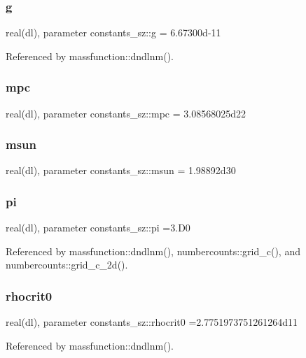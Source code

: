 \subsubsection{\texorpdfstring{g}{g}}
{\footnotesize\ttfamily real(dl), parameter constants\+\_\+sz\+::g = 6.\+67300d-\/11}



Referenced by massfunction\+::dndlnm().

\mbox{\label{namespaceconstants__sz_a961cb32bc8976382938d3a7904a98a59}} 
\subsubsection{\texorpdfstring{mpc}{mpc}}
{\footnotesize\ttfamily real(dl), parameter constants\+\_\+sz\+::mpc = 3.\+08568025d22}

\mbox{\label{namespaceconstants__sz_a1722de599fff703c9c4ed22a8944cde8}} 
\subsubsection{\texorpdfstring{msun}{msun}}
{\footnotesize\ttfamily real(dl), parameter constants\+\_\+sz\+::msun = 1.\+98892d30}

\mbox{\label{namespaceconstants__sz_a60522a8c991ef19549e52f3e2818a7b9}} 
\subsubsection{\texorpdfstring{pi}{pi}}
{\footnotesize\ttfamily real(dl), parameter constants\+\_\+sz\+::pi =3.\+D0}



Referenced by massfunction\+::dndlnm(), numbercounts\+::grid\+\_\+c(), and numbercounts\+::grid\+\_\+c\+\_\+2d().

\mbox{\label{namespaceconstants__sz_a7428cc3cfaacdf588f533cb06a70822d}} 
\subsubsection{\texorpdfstring{rhocrit0}{rhocrit0}}
{\footnotesize\ttfamily real(dl), parameter constants\+\_\+sz\+::rhocrit0 =2.\+7751973751261264d11}



Referenced by massfunction\+::dndlnm().

